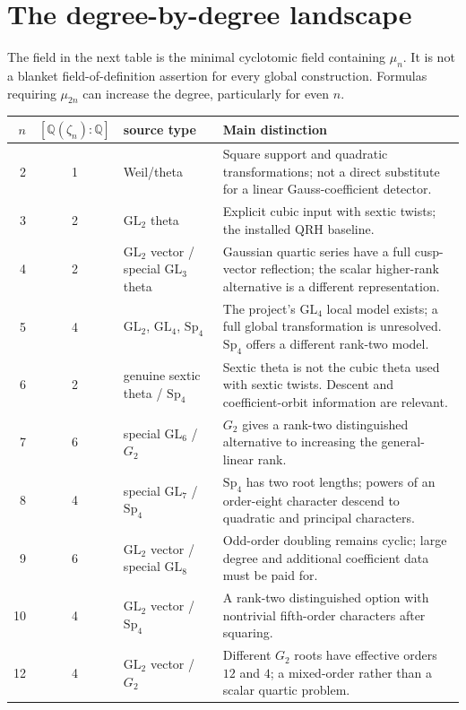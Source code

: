 \documentclass[11pt]{article}
\newcommand{\toprule}{\hline}
\newcommand{\midrule}{\hline}
\newcommand{\bottomrule}{\hline}
\newcommand{\QQ}{\mathbb Q}
\newcommand{\GL}{\mathrm{GL}}
\newcommand{\Sp}{\mathrm{Sp}}
\begin{document}
\section{The degree-by-degree landscape}

The field in the next table is the minimal cyclotomic field containing
$\mu_n$. It is not a blanket field-of-definition assertion for every
global construction. Formulas requiring $\mu_{2n}$ can increase the
degree, particularly for even $n$.
\begin{center}
\begin{tabular}{rclp{8.0cm}}
\toprule
$n$ & $[\QQ(\zeta_n):\QQ]$ & source type & Main distinction\\
\midrule
2 & 1 & Weil/theta & Square support and quadratic transformations;
not a direct substitute for a linear Gauss-coefficient detector.\\
3 & 2 & $\GL_2$ theta & Explicit cubic input with sextic twists;
the installed QRH baseline.\\
4 & 2 & $\GL_2$ vector / special $\GL_3$ theta &
Gaussian quartic series have a full cusp-vector reflection;
the scalar higher-rank alternative is a different representation.\\
5 & 4 & $\GL_2$, $\GL_4$, $\Sp_4$ &
The project's $\GL_4$ local model exists; a full global
transformation is unresolved. $\Sp_4$ offers a different rank-two model.\\
6 & 2 & genuine sextic theta / $\Sp_4$ &
Sextic theta is not the cubic theta used with sextic twists.
Descent and coefficient-orbit information are relevant.\\
7 & 6 & special $\GL_6$ / $G_2$ &
$G_2$ gives a rank-two distinguished alternative to increasing
the general-linear rank.\\
8 & 4 & special $\GL_7$ / $\Sp_4$ &
$\Sp_4$ has two root lengths; powers of an order-eight character
descend to quadratic and principal characters.\\
9 & 6 & $\GL_2$ vector / special $\GL_8$ &
Odd-order doubling remains cyclic; large degree and additional
coefficient data must be paid for.\\
10 & 4 & $\GL_2$ vector / $\Sp_4$ &
A rank-two distinguished option with nontrivial fifth-order
characters after squaring.\\
12 & 4 & $\GL_2$ vector / $G_2$ &
Different $G_2$ roots have effective orders $12$ and $4$;
a mixed-order rather than a scalar quartic problem.\\
\bottomrule
\end{tabular}
\end{center}
\end{document}
